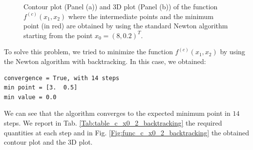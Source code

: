 \documentclass[a4paper,11pt]{article}
\begin{document}
	\begin{figure}[htb]
		\centering
		 \quad
		\caption{Contour plot (Panel (a)) and 3D plot (Panel (b)) of the function $f^{(c)}(x_{1},x_{2})$ where the intermediate points and the minimum point (in red) are obtained by using the standard Newton algorithm starting from the point $x_{0}=(8,0.2)^{T}$.}
		\label{Fig:func_c_x0_2}
	\end{figure}

\noindent To solve this problem, we tried to minimize the function $f^{(c)}(x_{1},x_{2})$ by using the Newton algorithm with backtracking. In this case, we obtained:
	\begin{verbatim}
convergence = True, with 14 steps
min point = [3.  0.5]
min value = 0.0
	\end{verbatim}
We can see that the algorithm converges to the expected minimum point in $14$ steps. We report in Tab. \ref{Tab:table_c_x0_2_backtracking} the required quantities at each step and in Fig. \ref{Fig:func_c_x0_2_backtracking} the obtained contour plot and the 3D plot.
\end{document}
